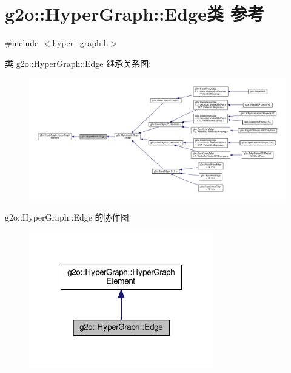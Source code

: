 \hypertarget{classg2o_1_1HyperGraph_1_1Edge}{\section{g2o\-:\-:Hyper\-Graph\-:\-:Edge类 参考}
\label{classg2o_1_1HyperGraph_1_1Edge}
}


{\ttfamily \#include $<$hyper\-\_\-graph.\-h$>$}



类 g2o\-:\-:Hyper\-Graph\-:\-:Edge 继承关系图\-:
\nopagebreak
\begin{figure}[H]
\begin{center}
\leavevmode
\includegraphics[width=350pt]{classg2o_1_1HyperGraph_1_1Edge__inherit__graph}
\end{center}
\end{figure}


g2o\-:\-:Hyper\-Graph\-:\-:Edge 的协作图\-:
\nopagebreak
\begin{figure}[H]
\begin{center}
\leavevmode
\includegraphics[width=228pt]{classg2o_1_1HyperGraph_1_1Edge__coll__graph}
\end{center}
\end{figure}
